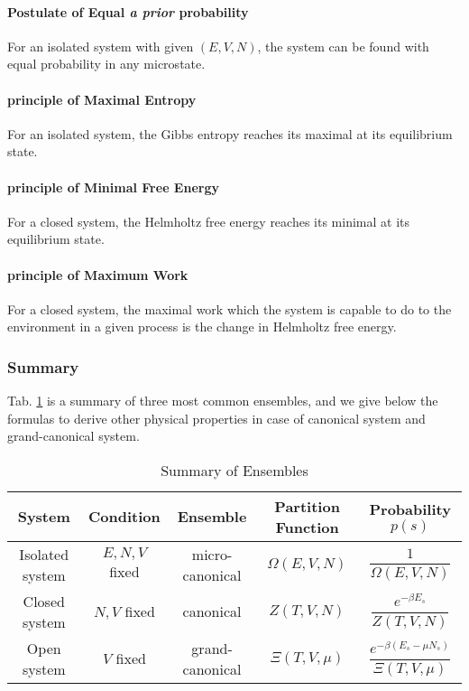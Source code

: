 \paragraph{Postulate of Equal \textit{a prior} probability}
For an isolated system with given $(E,V,N)$, the system can be found with equal probability in any microstate.
\paragraph{principle of Maximal Entropy}
For an isolated system, the Gibbs entropy reaches its maximal at its equilibrium state.
\paragraph{principle of Minimal Free Energy}
For a closed system, the Helmholtz free energy reaches its minimal at its equilibrium state.
\paragraph{principle of Maximum Work}
For a closed system, the maximal work which the system is capable to do to the environment in a given process is the change in Helmholtz free energy.

\subsubsection{Summary}\label{SM-ToE-Sum}
Tab. \ref{tab:ensemble} is a summary of three most common ensembles, and we give below the formulas to derive other physical properties in case of canonical system and grand-canonical system.

\begin{table}[!h]
	\caption{Summary of Ensembles}
	\label{tab:ensemble}
	\centering
	\begin{tabular}{ccccc}
		\toprule
		System & Condition & Ensemble & Partition Function & Probability $p(s)$\\
		\midrule
		Isolated system & $E,N,V$ fixed & micro-canonical & $\Omega(E,V,N)$ & $\dfrac{1}{\Omega(E,V,N)}$\\
		Closed system & $N,V$ fixed & canonical & $Z(T,V,N)$ & $\dfrac{e^{-\beta E_s} }{Z(T,V,N)}$\\
		Open system & $V$ fixed & grand-canonical & $\Xi(T,V,\mu)$&$\dfrac{e^{-\beta(E_s-\mu N_s)} }{ \Xi(T,V,\mu)}$\\
		\bottomrule
	\end{tabular}
\end{table}

